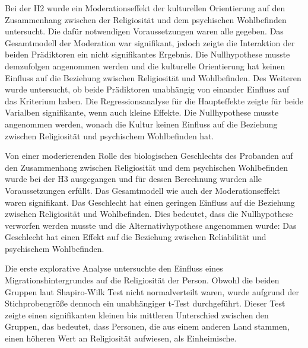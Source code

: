 Bei der H2 wurde ein Moderationseffekt der kulturellen Orientierung auf den Zusammenhang zwischen der Religiosität und dem psychischen Wohlbefinden untersucht. Die dafür notwendigen Voraussetzungen waren alle gegeben. Das Gesamtmodell der Moderation war signifikant, jedoch zeigte die Interaktion der beiden Prädiktoren ein nicht signifikantes Ergebnis. Die Nullhypothese musste demzufolgen angenommen werden und die kulturelle Orientierung hat keinen Einfluss auf die Beziehung zwischen Religiosität und Wohlbefinden. Des Weiteren wurde untersucht, ob beide Prädiktoren unabhängig von einander Einfluss auf das Kriterium haben. Die Regressionsanalyse für die Haupteffekte zeigte für beide Varialben signifikante, wenn auch kleine Effekte. Die Nullhypothese musste angenommen werden, wonach die Kultur keinen Einfluss auf die Beziehung zwischen Religiosität und psychischem Wohlbefinden hat.

Von einer moderierenden Rolle des biologischen Geschlechts des Probanden auf den Zusammenhang zwischen Religiosität und dem psychischen Wohlbefinden wurde bei der H3 ausgegangen und für dessen Berechnung wurden alle Voraussetzungen erfüllt. Das Gesamtmodell wie auch der Moderationseffekt waren signifikant. Das Geschlecht hat einen geringen Einfluss auf die Beziehung zwischen Religiosität und Wohlbefinden. Dies bedeutet, dass die Nullhypothese verworfen werden musste und die Alternativhypothese angenommen wurde: Das Geschlecht hat einen Effekt auf die Beziehung zwischen Reliabilität und psychischem Wohlbefinden.

Die erste explorative Analyse untersuchte den Einfluss eines Migrationshintergrundes auf die Religiosität der Person. Obwohl die beiden Gruppen laut Shapiro-Wilk Test nicht normalverteilt waren, wurde aufgrund der Stichprobengröße dennoch ein unabhängiger t-Test durchgeführt. Dieser Test zeigte einen signifikanten kleinen bis mittleren Unterschied zwischen den Gruppen, das bedeutet, dass Personen, die aus einem anderen Land stammen, einen höheren Wert an Religiosität aufwiesen, als Einheimische.

